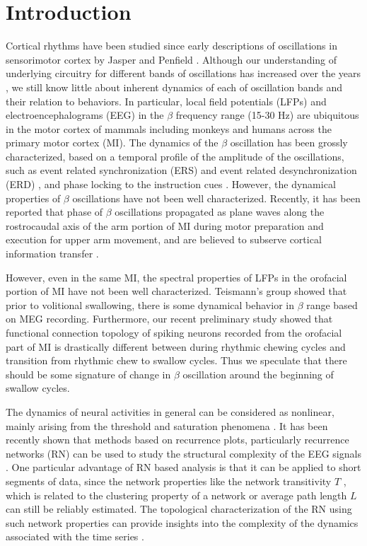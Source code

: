 \documentclass[letterpaper, 9pt, conference]{ieeeconf}
\begin{document}
\section{Introduction}
Cortical rhythms have been studied since early descriptions of oscillations in sensorimotor cortex by Jasper and Penfield \cite{jasper1949}. 
Although our understanding of underlying circuitry for different bands of oscillations has increased over the years \cite{Womelsdorf2014}, we still know little about inherent dynamics of each of oscillation bands and their relation to behaviors. In particular, local field potentials (LFPs) and electroencephalograms (EEG) in the $\beta$ frequency range (15-30 Hz) are ubiquitous in the motor cortex of mammals including monkeys and humans across the primary motor cortex (MI). The dynamics of the $\beta$ oscillation has been grossly characterized, based on a temporal profile of the amplitude of the oscillations, such as event related synchronization (ERS) and event related desynchronization (ERD) \cite{neuper2001, Jurkiewicz20061281}, and phase locking to the instruction cues \cite{jake2011}. However, the dynamical properties of $\beta$ oscillations have not been well characterized. Recently, it has been reported that phase of $\beta$ oscillations propagated as plane waves along the rostrocaudal axis of the arm portion of MI during motor preparation and execution for upper arm movement, and are believed to subserve cortical information transfer \cite{doug2006betawave}. 

However, even in the same MI, the spectral properties of LFPs in the orofacial portion of MI have not been well characterized. Teismann's group showed \cite{Teismann2009} that prior to volitional swallowing, there is some dynamical behavior in $\beta$ range based on MEG recording. Furthermore, our recent preliminary study showed \cite{Takahashi2012a} that functional connection topology of spiking neurons recorded from the orofacial part of MI is drastically different between during rhythmic chewing cycles and transition from rhythmic chew to swallow cycles.  Thus we speculate that there should be some signature of change in $\beta$ oscillation around the beginning of swallow cycles. 

The dynamics of neural activities in general can be considered as nonlinear, mainly arising from the threshold and saturation phenomena \cite{andrzejak2001indications}. It has been recently shown that methods based on recurrence plots, particularly recurrence networks (RN) can be used to study the structural complexity of the EEG signals \cite{subramaniyam2014characterization, subramaniyam2013analysis}. One particular advantage of  RN based analysis is that it can be applied to short segments of data, since the network properties like the network transitivity $T$ \cite{boccaletti2006complex}, which is related to the clustering property of a network \cite{barrat2000properties} or average path length $L$ can still be reliably estimated. The topological characterization of the RN using such network properties can provide insights into the complexity of the dynamics associated with the time series \cite{donner2010recurrence}. 
\end{document}
